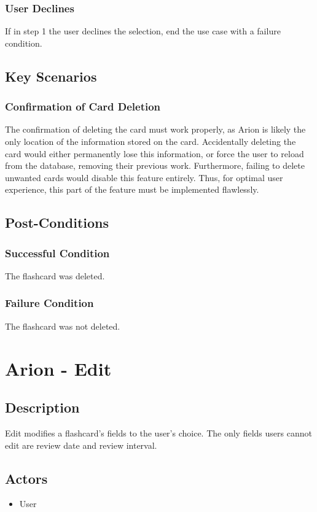 \documentclass{scrreprt}
\begin{document}
    \subsection{User Declines}
    If in step 1 the user declines the selection,
    end the use case with a failure condition.

\section{Key Scenarios}
    \subsection{Confirmation of Card Deletion}
    The confirmation of deleting the card must work properly,
    as Arion is likely the only location of the information stored on the card.
    Accidentally deleting the card would either permanently lose this information,
    or force the user to reload from the database, removing their previous work.
    Furthermore, failing to delete unwanted cards would disable this feature entirely.
    Thus, for optimal user experience, this part of the feature must be implemented flawlessly.

\section{Post-Conditions}
    \subsection{Successful Condition}
    The flashcard was deleted.
    
    \subsection{Failure Condition}
    The flashcard was not deleted.


\chapter{Arion - Edit}

\section{Description}
Edit modifies a flashcard's fields to the user's choice.
The only fields users cannot edit are review date and review interval.

\section{Actors}
\begin{itemize}
    \item User
\end{itemize}
\end{document}
